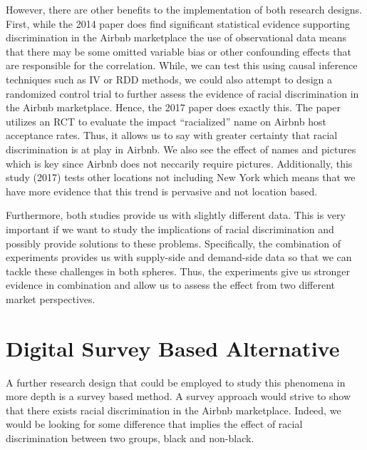 \documentclass[dvips,12pt]{article}
\begin{document}
However, there are other benefits to the implementation of both research designs. First, while the 2014 paper does find significant statistical evidence supporting discrimination in the Airbnb marketplace the use of observational data means that there may be some omitted variable bias or other confounding effects that are responsible for the correlation. While, we can test this using causal inference techniques such as IV or RDD methods, we could also attempt to design a randomized control trial to further assess the evidence of racial discrimination in the Airbnb marketplace. Hence, the 2017 paper does exactly this. The paper utilizes an RCT to evaluate the impact “racialized” name on Airbnb host acceptance rates. Thus, it allows us to say with greater certainty that racial discrimination is at play in Airbnb. We also see the effect of names and pictures which is key since Airbnb does not neccarily require pictures. Additionally, this study (2017) tests other locations not including New York which means that we have more evidence that this trend is pervasive and not location based. 

Furthermore, both studies provide us with slightly different data. This is very important if we want to study the implications of racial discrimination and possibly provide solutions to these problems. Specifically, the combination of experiments provides us with supply-side and demand-side data so that we can tackle these challenges in both spheres. Thus, the experiments give us stronger evidence in combination and allow us to assess the effect from two different market perspectives.
\section{Digital Survey Based Alternative}
A further research design that could be employed to study this phenomena in more depth is a survey based method. A survey approach would strive to show that there exists racial discrimination in the Airbnb marketplace. Indeed, we would be looking for some difference that implies the effect of racial discrimination between two groups, black and non-black.
\end{document}
